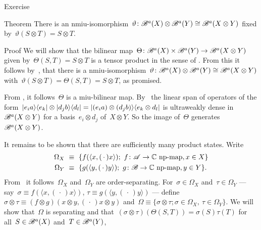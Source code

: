 \documentclass[b]{subfiles}
\begin{document}
\begin{parsec}
\begin{point}{Exercise}
\begin{enumerate}
\end{enumerate}
\end{point}
\begin{point}{Theorem}%
There is an
    nmiu-isomorphism~$\vartheta\colon \mathscr{B}^a(X) \otimes \mathscr{B}^a(Y) \cong \mathscr{B}^a(X \otimes Y)$
    fixed by~$\vartheta(S\otimes T) = S \otimes T$.
\begin{point}{Proof}%
We will show that
    the bilinear map~$\Theta \colon 
            \mathscr{B}^a(X) \times \mathscr{B}^a(Y) \to
    \mathscr{B}^a(X \otimes Y)$
    given by~$\Theta(S,T) = S \otimes T$
    is a tensor product in the sense of .
From this it follows by~,
that there is a
    nmiu-isomorphism~$\vartheta\colon \mathscr{B}^a(X) \otimes \mathscr{B}^a(Y) \cong \mathscr{B}^a(X \otimes Y)$
    with~$\vartheta(S\otimes T) = \Theta(S , T) = S \otimes T$, as promised.
\begin{point}%
From , it follows~$\Theta$ is a miu-bilinear map.
By~
    the linear span of operators of the form~$
        \left|e_i a\right>\!\left<e_k\right| \otimes \left|d_j b \right>\!\left<d_l\right|
        = \left|(e_i a) \otimes (d_j b)\right>\!\left<e_k \otimes d_l\right| $
        is ultraweakly dense in~$\mathscr{B}^a(X \otimes Y)$
        for a basis~$e_i \otimes d_j$ of~$X \otimes Y$.
        So the image of~$\Theta$ generates~$\mathscr{B}^a(X\otimes Y)$.
\begin{point}%
    It remains to be shown that there are sufficiently many product states.
    Write
    \begin{align*}
        \Omega_X &\ \equiv \ 
                    \{ f(\langle x, (\,\cdot\,) x \rangle);
                    \ f \colon \scrA \to \C \text{ np-map}, x\in X \} \\
        \Omega_Y& \  \equiv\ 
                    \{ g(\langle y, (\,\cdot\,) y \rangle);
                    \ g \colon \scrB \to \C \text{ np-map}, y\in Y \}.
    \end{align*}
From~\sref{hilbmod-ordersep}
    it follows~$\Omega_X$  and~$\Omega_Y$ are order-separating.
For~$\sigma \in \Omega_X$ and~$\tau \in \Omega_Y$
 --- say~$\sigma \equiv f(\langle x, (\,\cdot\,) x\rangle)$,
    $\tau \equiv g(\langle y, (\,\cdot\,) y\rangle)$ ---
    define~$\sigma \otimes \tau \equiv
        (f \otimes g) (x \otimes y, (\,\cdot\,) x\otimes y) $
        and~$\Omega \equiv \{\sigma \otimes \tau; \sigma \in \Omega_X,
                    \ \tau \in \Omega_Y\}$.
We will show
    that~$\Omega$ is separating
    and that~$(\sigma \otimes \tau)(\Theta(S,T)) = \sigma(S) \tau(T)$
    for all~$S \in \mathscr{B}^a(X)$ and~$T \in \mathscr{B}^a(Y)$,

\end{point}
\end{point}
\end{point}
\end{point}
\end{parsec}
\end{document}
